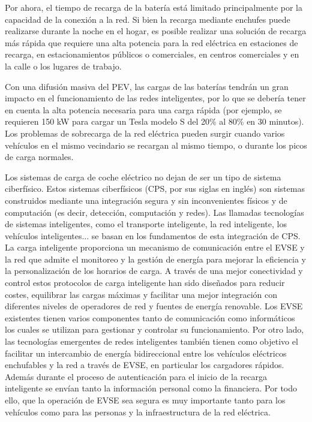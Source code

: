 \documentclass[12pt,a4paper,onecolumn,oneside]{report}
\begin{document}
Por ahora, el tiempo de recarga de la batería está limitado principalmente por la capacidad de la conexión a la red. Si bien la recarga mediante enchufes puede realizarse durante la noche en el hogar, es posible realizar una solución de recarga más rápida que requiere una alta potencia para la red eléctrica en estaciones de recarga, en estacionamientos públicos o comerciales, en centros comerciales y en la calle o los lugares de trabajo.

Con una difusión masiva del PEV, las cargas de las baterías tendrán un gran impacto en el funcionamiento de las redes inteligentes, por lo que se debería tener en cuenta la alta potencia necesaria para una carga rápida (por ejemplo, se requieren 150 kW para cargar un Tesla modelo S del 20\% al 80\% en 30 minutos). Los problemas de sobrecarga de la red eléctrica pueden surgir cuando varios vehículos en el mismo vecindario se recargan al mismo tiempo, o durante los picos de carga normales.

Los sistemas de carga de coche eléctrico no dejan de ser un tipo de sistema ciberfísico. Estos sistemas ciberfísicos (CPS, por sus siglas en inglés) son sistemas construidos mediante una integración segura y sin inconvenientes físicos y de computación (es decir, detección, computación y redes). Las llamadas tecnologías de sistemas inteligentes, como el transporte inteligente, la red inteligente, los vehículos inteligentes... se basan en los fundamentos de esta integración de CPS. La carga inteligente proporciona un mecanismo de comunicación entre el EVSE y la red que admite el monitoreo y la gestión de energía para mejorar la eficiencia y la personalización de los horarios de carga. A través de una mejor conectividad y control estos protocolos de carga inteligente han sido diseñados para reducir costes, equilibrar las cargas máximas y facilitar una mejor integración con diferentes niveles de operadores de red y fuentes de energía renovable. Los EVSE existentes tienen varios componentes tanto de comunicación como informáticos los cuales se utilizan para gestionar y controlar su funcionamiento. Por otro lado, las tecnologías emergentes de redes inteligentes también tienen como objetivo el facilitar un intercambio de energía bidireccional entre los vehículos eléctricos enchufables y la red a través de EVSE, en particular los cargadores rápidos. Además durante el proceso de autenticación para el inicio de la recarga inteligente se envían tanto la información personal como la financiera. Por todo ello, que la operación de EVSE sea segura es muy importante tanto para los vehículos como para las personas y la infraestructura de la red eléctrica.
\end{document}
